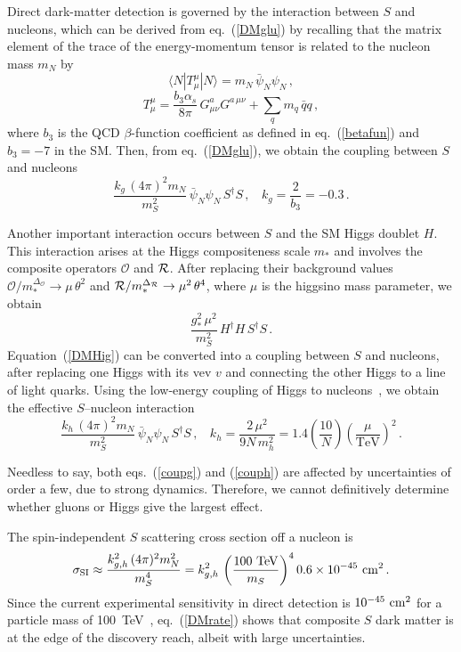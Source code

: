 \documentclass[a4paper,12pt]{article}
\newcommand{\tev}{\textrm{TeV}}
\newcommand{\beq}{\begin{equation}}
\newcommand{\eeq}{\end{equation}}
\def\eq#1{eq.~(\ref{#1})}
\def\eq#1{eq.~(\ref{#1})}
\def\O{\mathcal{O}}
\def\mst{m_*}
\def\mS{m_S}
\begin{document}
{{{{Direct dark-matter detection is governed by the interaction between $S$ and nucleons, which can be derived from \eq{DMglu} by recalling that the matrix element of the trace of the energy-momentum tensor is related to the nucleon mass $m_N$ by
\beq
\langle N | T^\mu_\mu | N\rangle = m_N\, {\bar \psi}_N \psi_N \, ,
\eeq
\beq
T^\mu_\mu = \frac{b_3 \alpha_s}{8\pi} \, G^a_{\mu\nu}G^{a\, \mu\nu} +\sum_q m_q \, {\bar q} q \, ,
\eeq
where $b_3$ is the QCD $\beta$-function coefficient as defined in \eq{betafun} and $b_3=-7$ in the SM. Then, from \eq{DMglu}, we obtain the coupling between $S$ and nucleons
\beq
 \frac{k_g\, (4\pi)^2 m_N}{\mS^2}\, {\bar \psi}_N \psi_N \, S^\dagger S \, , ~~~~ k_g =\frac{2}{b_3}=-0.3 \, .
 \label{coupg}
\eeq

Another important interaction occurs between $S$ and the SM Higgs doublet $H$. This interaction arises at the Higgs compositeness scale $\mst$ and involves the composite operators $\O$ and $\cal R$. After replacing their background values $\O/\mst^{\Delta_\O}\to \mu \,\theta^2$ and ${\cal R}/\mst^{\Delta_{\cal R}}\to \mu^2 \,\theta^4$, where $\mu$ is the higgsino mass parameter, we obtain
\beq
\frac{g_*^2\, \mu^2}{\mS^2}\, H^\dagger H \, S^\dagger S \, .
\label{DMHig}
\eeq
Equation~(\ref{DMHig}) can be converted into a coupling between $S$ and nucleons, after replacing one Higgs with its vev $v$ and connecting the other Higgs to a line of light quarks. Using the low-energy coupling of Higgs to nucleons~\cite{Shifman:1978zn}, we obtain the effective $S$--nucleon interaction
\beq
\frac{k_h\, (4\pi)^2 m_N}{ \mS^2}\, {\bar \psi}_N \psi_N \, S^\dagger S \, , ~~~~ k_h =\frac{2\,  \mu^2}{9 N\, m_h^2}=1.4\left(\frac{ 10}{N}\right) \left(\frac{\mu}{\tev}\right)^2\, .
 \label{couph}
\eeq

Needless to say, both eqs.~(\ref{coupg}) and (\ref{couph}) are affected by uncertainties of order a few, due to strong dynamics. Therefore, we cannot definitively determine whether gluons or Higgs give the largest effect.

The spin-independent $S$ scattering cross section off a nucleon is
\beq
\sigma_{\rm SI} \approx \frac{k_{g,h}^2\, (4\pi)^2 m_N^2}{ \mS^4}=k_{g,h}^2\, \left( \frac{100~\tev}{\mS}\right)^4 0.6 \times 10^{-45}~{\rm cm}^2 \, .
\label{DMrate}
\eeq
Since the current experimental sensitivity in direct detection is $10^{-45}~{\rm cm}^2$ for a particle mass of 100~TeV~\cite{LZ:2024zvo}, \eq{DMrate} shows that composite $S$ dark matter is at the edge of the discovery reach, albeit with large uncertainties.

}}}}
\end{document}

